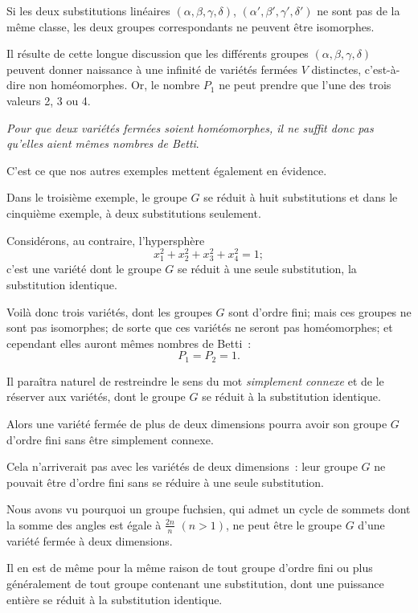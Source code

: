 \documentclass{article}
\begin{document}
Si les deux substitutions linéaires $(\alpha, \beta, \gamma, \delta)$, $(\alpha', \beta', \gamma', \delta')$ ne sont pas de la même classe, les deux groupes correspondants ne peuvent être isomorphes.

Il résulte de cette longue discussion que les différents groupes $(\alpha, \beta, \gamma, \delta)$ peuvent donner naissance à une infinité de variétés fermées $V$ distinctes, c'est-à-dire non homéomorphes. Or, le nombre $P_{1}$ ne peut prendre que l'une des trois valeurs 2, 3 ou 4.

\emph{Pour que deux variétés fermées soient homéomorphes, il ne suffit donc pas qu'elles aient mêmes nombres de Betti}.

C'est ce que nos autres exemples mettent également en évidence.

Dans le troisième exemple, le groupe $G$ se réduit à huit substitutions et dans le cinquième exemple, à deux substitutions seulement.

Considérons, au contraire, l'hypersphère
\[ x^{2}_{1} + x^{2}_{2} + x^{2}_{3} + x^{2}_{4} = 1; \]
c'est une variété dont le groupe $G$ se réduit à une seule substitution, la substitution identique.

Voilà donc trois variétés, dont les groupes $G$ sont d'ordre fini; mais ces groupes ne sont pas isomorphes; de sorte que ces variétés ne seront
pas homéomorphes; et cependant elles auront mêmes nombres de Betti~:
\[ P_{1} = P_{2} = 1. \]

Il paraîtra naturel de restreindre le sens du mot \emph{simplement connexe} et de le réserver aux variétés, dont le groupe $G$ se réduit à la substitution identique.

Alors une variété fermée de plus de deux dimensions pourra avoir son groupe $G$ d'ordre fini sans être simplement connexe.

Cela n'arriverait pas avec les variétés de deux dimensions~: leur groupe $G$ ne pouvait être d'ordre fini sans se réduire à une seule substitution.

Nous avons vu pourquoi un groupe fuchsien, qui admet un cycle de sommets dont la somme des angles est égale à $\frac{2n}{n}$ $(n > 1)$, ne peut être le groupe $G$ d'une variété fermée à deux dimensions.

Il en est de même pour la même raison de tout groupe d'ordre fini ou plus généralement de tout groupe contenant une substitution, dont une puissance entière se réduit à la substitution identique.
\end{document}
